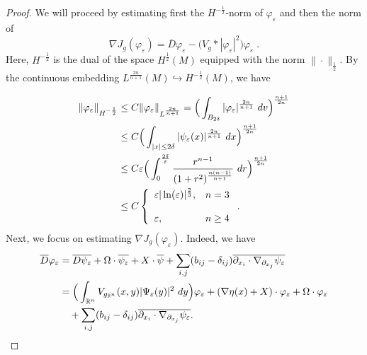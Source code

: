 \documentclass[10pt,a4paper]{amsart}
\def \R {\mathbb{R}}
\begin{document}
\begin{proof}
We will proceed by estimating first the $H^{-\frac{1}{2}}$-norm of $\varphi_{\varepsilon}$ and then the norm of 
$$\nabla J_{g}(\varphi_{\varepsilon})=\overline{D}\varphi_{\varepsilon}-\Big(V_{g}*|\varphi_{\varepsilon}|^{2}\Big)\varphi_{\varepsilon}\; .$$ 
Here, $H^{-\frac{1}{2}}$ is the dual of the space $H^{\frac{1}{2}}(M)$ equipped with the norm $\|\cdot \|_{\frac{1}{2}}$. By the continuous embedding $L^{\frac{2n}{n+1}}(M)\hookrightarrow H^{-\frac{1}{2}}(M)$, we have

\begin{align}
\|\varphi_{\varepsilon}\|_{H^{-\frac{1}{2}}}&\leq C \|\varphi_{\varepsilon}\|_{L^{\frac{2n}{n+1}}}=\Big(\int_{B_{2\delta}}|\varphi_{\varepsilon}|^{\frac{2n}{n+1}}\ dv\Big)^{\frac{n+1}{2n}}\notag\\
&\leq C \Big(\int_{|x|\leq 2\delta} |\psi_{\varepsilon}(x)|^{\frac{2n}{n+1}}\ dx \Big)^{\frac{n+1}{2n}}\notag\\
&\leq C\varepsilon\Big(\int_{0}^{\frac{2\delta}{\varepsilon}} \frac{r^{n-1}}{(1+r^{2})^{\frac{n(n-1)}{n+1}}}\ dr \Big)^{\frac{n+1}{2n}} \notag\\
&\leq C\left\{\begin{array}{ll}
\varepsilon |\ln(\varepsilon)|^{\frac{2}{3}}, & n=3\\
\\
\varepsilon, & n\geq 4 
\end{array}
\right..\label{phieps}
\end{align}
Next, we focus on estimating $\nabla J_{g}(\varphi_{\varepsilon})$. Indeed, we have
\begin{align}
\overline{D}\varphi_{\varepsilon}&=\overline{D\psi_{\varepsilon}}+\Omega\cdot \overline{\psi_{\varepsilon}}+X\cdot \overline{\psi}+\sum_{i,j}(b_{ij}-\delta_{ij})\overline{\partial_{x_{i}}\cdot \nabla_{\partial_{x_{j}}}\psi_{\varepsilon}}\notag\\
&=\Big(\int_{\R^{n}}V_{g_{\R^{n}}}(x,y)|\Psi_{\varepsilon}(y)|^{2}\ dy\Big) \varphi_{\varepsilon}+(\nabla\eta(x)+X) \cdot \varphi_{\varepsilon}+\Omega\cdot \varphi_{\varepsilon}\notag\\
&\quad+\sum_{i,j}(b_{ij}-\delta_{ij})\overline{\partial_{x_{i}}\cdot \nabla_{\partial_{x_{j}}}\psi_{\varepsilon}}.\label{decomp}
\end{align}



\end{proof}
\end{document}

